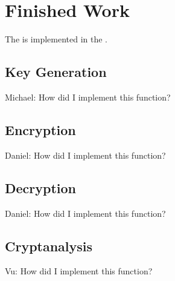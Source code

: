 \section{Finished Work}

The \cs{} \rsa{} is implemented in the \cf{} \cry.


\subsection{Key Generation}

Michael:
How did I implement this function?


\subsection{Encryption}

Daniel:
How did I implement this function?


\subsection{Decryption}

Daniel:
How did I implement this function?


\subsection{Cryptanalysis}

Vu:
How did I implement this function?
